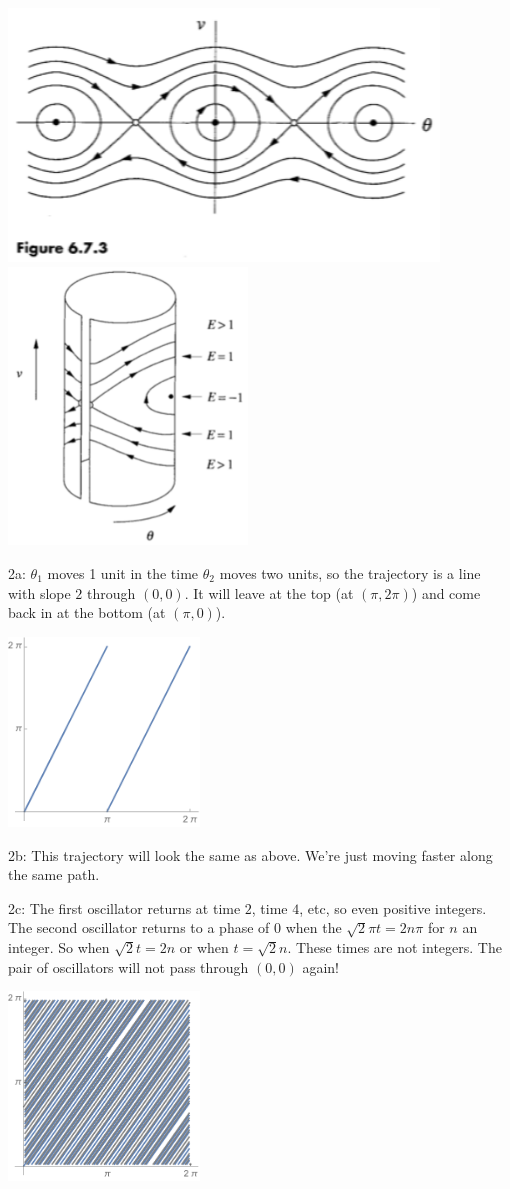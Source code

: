 \documentclass[12pt,letterpaper,noanswers]{exam}
\begin{document}
\includegraphics[width=4.5in]{img/191004p3.png}
\includegraphics[width=2.5in]{img/191004p4.png}


2a: $\theta_1$ moves 1 unit in the time $\theta_2$ moves two units, so the trajectory is a line with slope $2$ through $(0,0)$.  It will leave at the top (at $(\pi,2\pi)$) and come back in at the bottom (at $(\pi,0)$). 

\includegraphics[width=2in]{img/191004p6.pdf}

2b: This trajectory will look the same as above.  We're just moving faster along the same path.

2c: The first oscillator returns at time $2$, time $4$, etc, so even positive integers.  The second oscillator returns to a phase of $0$ when the $\sqrt{2}\pi t = 2n\pi$ for $n$ an integer.  So when $\sqrt{2}t = 2n$ or when $t = \sqrt{2}n$.  These times are not integers.  The pair of oscillators will not pass through $(0,0)$ again!

\includegraphics[width=2in]{img/191004p5.pdf}
\end{document}
